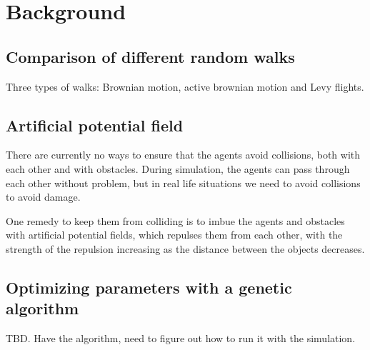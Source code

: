 \section{Background}

\subsection{Comparison of different random walks}
Three types of walks: Brownian motion, active brownian motion and Levy flights. 

\subsection{Artificial potential field}
There are currently no ways to ensure that the agents avoid collisions, both with each other and with obstacles. During simulation, the agents can pass through each other without problem, but in real life situations we need to avoid collisions to avoid damage. 

One remedy to keep them from colliding is to imbue the agents and obstacles with artificial potential fields, which repulses them from each other, with the strength of the repulsion increasing as the distance between the objects decreases. 





\subsection{Optimizing parameters with a genetic algorithm} 
TBD. Have the algorithm, need to figure out how to run it with the simulation. 
